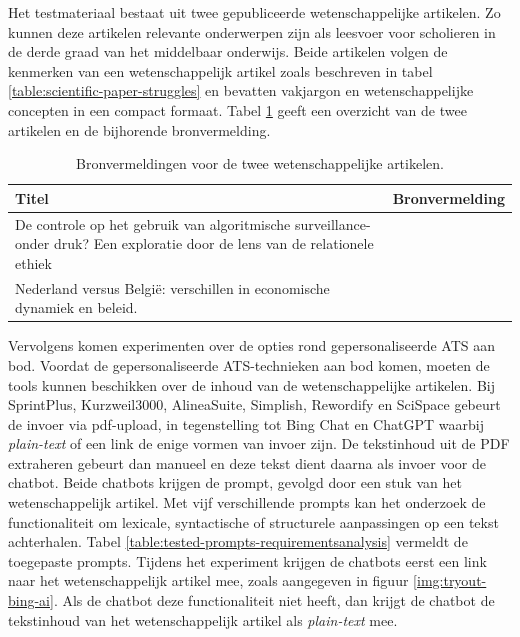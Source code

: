 Het testmateriaal bestaat uit twee gepubliceerde wetenschappelijke artikelen. Zo kunnen deze artikelen relevante onderwerpen zijn als leesvoer voor scholieren in de derde graad van het middelbaar onderwijs. Beide artikelen volgen de kenmerken van een wetenschappelijk artikel zoals beschreven in tabel \ref{table:scientific-paper-struggles} en bevatten vakjargon en wetenschappelijke concepten in een compact formaat. Tabel \ref{table:referentieteksten-bronvermelding} geeft een overzicht van de twee artikelen en de bijhorende bronvermelding.

\begin{center}
	\begin{table}[H]
		\begin{tabular}{ | m{10cm} | m{5cm} | } 
			\hline
			\textbf{Titel} & \textbf{Bronvermelding} \\
			\hline
			De controle op het gebruik van algoritmische surveillance- onder druk? Een exploratie door de lens van de relationele ethiek & \autocite{VanBrakel2022} \\
			\hline
			Nederland versus België: verschillen in economische dynamiek en beleid. & \autocite{Sleuwaegen2022} \\
			\hline
		\end{tabular}
		\caption{Bronvermeldingen voor de twee wetenschappelijke artikelen.}
		\label{table:referentieteksten-bronvermelding}
	\end{table}
\end{center}

\medspace

Vervolgens komen experimenten over de opties rond gepersonaliseerde ATS aan bod. Voordat de gepersonaliseerde ATS-technieken aan bod komen, moeten de tools kunnen beschikken over de inhoud van de wetenschappelijke artikelen. Bij SprintPlus, Kurzweil3000, AlineaSuite, Simplish, Rewordify en SciSpace gebeurt de invoer via pdf-upload, in tegenstelling tot Bing Chat en ChatGPT waarbij \textit{plain-text} of een link de enige vormen van invoer zijn. De tekstinhoud uit de PDF extraheren gebeurt dan manueel en deze tekst dient daarna als invoer voor de chatbot. Beide chatbots krijgen de prompt, gevolgd door een stuk van het wetenschappelijk artikel. Met vijf verschillende prompts kan het onderzoek de functionaliteit om lexicale, syntactische of structurele aanpassingen op een tekst achterhalen. Tabel \ref{table:tested-prompts-requirementsanalysis} vermeldt de toegepaste prompts. Tijdens het experiment krijgen de chatbots eerst een link naar het wetenschappelijk artikel mee, zoals aangegeven in figuur \ref{img:tryout-bing-ai}. Als de chatbot deze functionaliteit niet heeft, dan krijgt de chatbot de tekstinhoud van het wetenschappelijk artikel als \textit{plain-text} mee. 

